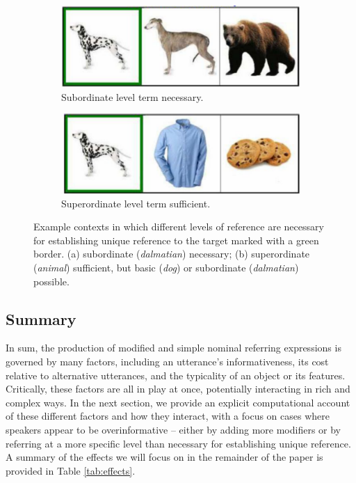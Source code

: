 \documentclass[11pt]{article}
\newcommand{\tableref}[1]{Table \ref{#1}}
\begin{document}
\begin{figure}
\begin{subfigure}{.5\textwidth}
\includegraphics[width=\textwidth]{pics/dog-subnecessary}
\caption{Subordinate level term necessary.}
\label{fig:subnecessary}
\end{subfigure}
\begin{subfigure}{.5\textwidth}
\includegraphics[width=\textwidth]{pics/dog-supersufficient}
\caption{Superordinate level term sufficient.}
\label{fig:supersufficient}
\end{subfigure}
\caption{Example contexts in which different levels of reference are necessary for establishing unique reference to the target marked with a green border. (a) subordinate (\emph{dalmatian}) necessary; (b) superordinate (\emph{animal}) sufficient, but basic  (\emph{dog}) or subordinate (\emph{dalmatian}) possible.}
\label{fig:dogexamples}
\end{figure}

\subsection{Summary}
\label{sec:introsummary}

In sum, the production of modified and simple nominal referring expressions is governed by many factors, including an utterance's informativeness, its cost relative to alternative utterances, and the typicality of an object or its features. 
Critically, these factors are all in play at once, potentially interacting in rich and complex ways.
In the next section, we provide an explicit computational account of these different factors and how they interact, with a focus on cases where speakers appear to be overinformative -- either by adding more modifiers or by referring at a more specific level than necessary for establishing unique reference. A summary of the effects we will focus on in the remainder of the paper is provided in \tableref{tab:effects}.
\end{document}
